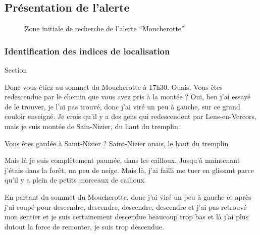 
\subsection{Présentation de l'alerte}
\label{subsec:9-3-1}


\begin{figure}
  \centering
  
  \caption{Zone initiale de recherche de l'alerte
    \enquote{Moucherotte}}
  \label{fig:zir_moucherotte}
\end{figure}

\subsubsection{Identification des indices de localisation}
\label{subsec:9-3-1-1}

Section

\begin{dialogue}
  \Sec {} Donc vous étiez au sommet du Moucherotte à 17h30.
  \Req Ouais.
  \Sec {} Vous êtes redescendue par le chemin que
  vous avez pris à la montée ?
  \Req {} Oui, ben j’ai essayé de le trouver, je l’ai pas
  trouvé,  donc j’ai viré un peu à gauche,  sur ce
  grand couloir enseigné.  Je crois qu’il y a des gens
  qui redescendent par Lens-en-Vercors,  mais je suis
  montée de Sain-Nizier, du haut du tremplin.
\end{dialogue}
% 


\begin{dialogue}
  \Sec {} Vous êtes gardée à Saint-Nizier ?
  \Req {} Saint-Nizier ouais, le haut du tremplin
\end{dialogue}


\begin{dialogue}
  \Req {} Mais là je suis complètement paumée,  dans
  les cailloux.  Jusqu’à maintenant j’étais dans la forêt,
   un peu de neige.  Mais là, j’ai failli me tuer
  en glissant  parce qu’il y a plein de petits morceaux de
  cailloux.
\end{dialogue}

\begin{dialogue}
  \Req {} En partant du sommet du Moucherotte, donc j’ai viré
  un peu à gauche et  après j'ai coupé pour 
  descendre, descendre, descendre, descendre et  j’ai pas
  retrouvé mon sentier et  je suis certainement descendue
  beaucoup trop bas et là  j’ai plus dutout la force de
  remonter, je suis trop descendue.
\end{dialogue}


